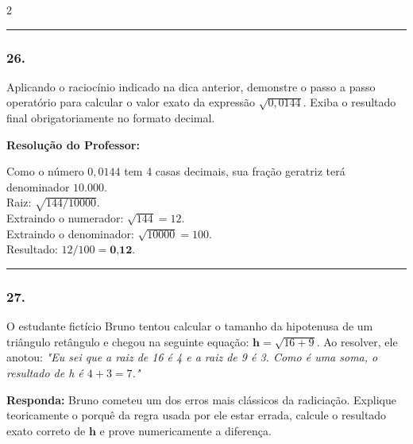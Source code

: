 \begin{multicols*}{2}
\noindent\textcolor{CorLinha}{\rule{\linewidth}{0.5pt}} 
\par\vspace{\espacoPreQuestao}
\subsubsection*{26.} Aplicando o raciocínio indicado na dica anterior, demonstre o passo a passo operatório para calcular o valor exato da expressão $ \sqrt{0,0144} $. Exiba o resultado final obrigatoriamente no formato decimal.

\ifgabarito
    \begin{tcolorbox}[colback=CorTitUm!5, colframe=CorTitUm, boxrule=1pt, arc=4pt, left=6pt, right=6pt, top=6pt, bottom=6pt]
    \small\textbf{\textcolor{CorTitUm}{Resolução do Professor:}}\par\vspace{0.1cm}
    \color{CinzaEscuro}
    Como o número $ 0,0144 $ tem 4 casas decimais, sua fração geratriz terá denominador $ 10.000 $.\\
    Raiz: $ \sqrt{144 / 10000} $.\\
    Extraindo o numerador: $ \sqrt{144} = 12 $.\\
    Extraindo o denominador: $ \sqrt{10000} = 100 $.\\
    Resultado: $ 12 / 100 = \textbf{0,12} $.
    \end{tcolorbox}
\fi

\par\vspace{\espacoQuestao}

\noindent\textcolor{CorLinha}{\rule{\linewidth}{0.5pt}} 
\par\vspace{\espacoPreQuestao}
\subsubsection*{27.} O estudante fictício Bruno tentou calcular o tamanho da hipotenusa de um triângulo retângulo e chegou na seguinte equação: $ \textbf{h} = \sqrt{16 + 9} $. Ao resolver, ele anotou: 
\textit{"Eu sei que a raiz de 16 é 4 e a raiz de 9 é 3. Como é uma soma, o resultado de h é $ 4 + 3 = 7 $."}
\begin{boxresponda}
\textbf{Responda:} Bruno cometeu um dos erros mais clássicos da radiciação. Explique teoricamente o porquê da regra usada por ele estar errada, calcule o resultado exato correto de $ \textbf{h} $ e prove numericamente a diferença.
\end{boxresponda}


\end{multicols*}
